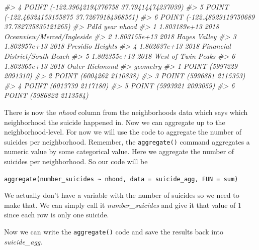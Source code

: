 \documentclass[
  12pt,
  openany]{book}
\newenvironment{Shaded}{\begin{snugshade}}{\end{snugshade}}
\newcommand{\CommentTok}[1]{\textcolor[rgb]{0.37,0.37,0.37}{\textit{#1}}}
\newcommand{\DecValTok}[1]{\textcolor[rgb]{0.06,0.06,0.06}{#1}}
\newcommand{\NormalTok}[1]{#1}
\newcommand{\OtherTok}[1]{\textcolor[rgb]{0.37,0.37,0.37}{#1}}
\newcommand{\SpecialCharTok}[1]{\textcolor[rgb]{0,0,0}{#1}}
\begin{document}
\begin{Shaded}
\begin{Highlighting}[]
\CommentTok{\#\textgreater{} 4  POINT ({-}122.39642194376758 37.79414474237039)}
\CommentTok{\#\textgreater{} 5  POINT ({-}122.46324153155875 37.72679184368551)}
\CommentTok{\#\textgreater{} 6 POINT ({-}122.48929119750689 37.782735835121265)}
\CommentTok{\#\textgreater{}           PdId year                          nhood}
\CommentTok{\#\textgreater{} 1 1.803189e+13 2018     Oceanview/Merced/Ingleside}
\CommentTok{\#\textgreater{} 2 1.803155e+13 2018                   Hayes Valley}
\CommentTok{\#\textgreater{} 3 1.802957e+13 2018               Presidio Heights}
\CommentTok{\#\textgreater{} 4 1.802637e+13 2018 Financial District/South Beach}
\CommentTok{\#\textgreater{} 5 1.802355e+13 2018             West of Twin Peaks}
\CommentTok{\#\textgreater{} 6 1.802365e+13 2018                 Outer Richmond}
\CommentTok{\#\textgreater{}                  geometry}
\CommentTok{\#\textgreater{} 1 POINT (5997229 2091310)}
\CommentTok{\#\textgreater{} 2 POINT (6004262 2110838)}
\CommentTok{\#\textgreater{} 3 POINT (5996881 2115353)}
\CommentTok{\#\textgreater{} 4 POINT (6013739 2117180)}
\CommentTok{\#\textgreater{} 5 POINT (5993921 2093059)}
\CommentTok{\#\textgreater{} 6 POINT (5986822 2113584)}
\end{Highlighting}
\end{Shaded}

There is now the \emph{nhood} column from the neighborhoods data which says which neighborhood the suicide happened in. Now we can aggregate up to the neighborhood-level.
For now we will use the code to aggregate the number of suicides per neighborhood. Remember, the \texttt{aggregate()} command aggregates a numeric value by some categorical value. Here we aggregate the number of suicides per neighborhood. So our code will be

\texttt{aggregate(number\_suicides\ \textasciitilde{}\ nhood,\ data\ =\ suicide\_agg,\ FUN\ =\ sum)}

We actually don't have a variable with the number of suicides so we need to make that. We can simply call it \emph{number\_suicides} and give it that value of 1 since each row is only one suicide.

\begin{Shaded}
\end{Shaded}

Now we can write the \texttt{aggregate()} code and save the results back into \emph{suicide\_agg}.
\end{document}
